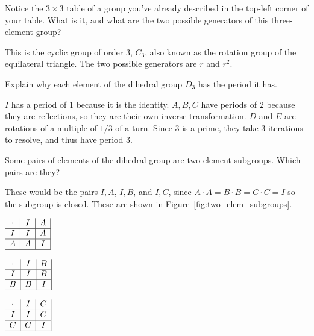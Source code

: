 \documentclass[../gatm_answers.tex]{subfiles}
\begin{document}
\begin{outer_problem}
\item Notice the $3\times 3$ table of a group you've already described in the top-left corner of your table. What is it, and what are the two possible generators of this three-element group?
\end{outer_problem}

This is the cyclic group of order $3$, $C_3$, also known as the rotation group of the equilateral triangle. The two possible generators are $r$ and $r^2$.

\begin{outer_problem}
\item Explain why each element of the dihedral group $D_3$ has the period it has.
\end{outer_problem}

$I$ has a period of $1$ because it is the identity. $A,B,C$ have periods of $2$ because they are reflections, so they are their own inverse transformation. $D$ and $E$ are rotations of a multiple of $1/3$ of a turn. Since $3$ is a prime, they take $3$ iterations to resolve, and thus have period $3$.

\begin{outer_problem}
\item Some pairs of elements of the dihedral group are two-element subgroups. Which pairs are they?
\end{outer_problem}

These would be the pairs ${I,A}$, ${I,B}$, and ${I,C}$, since $A\cdot A=B\cdot B=C\cdot C = I$ so the subgroup is closed. These are shown in Figure~\ref{fig:two_elem_subgroups}.

\begin{center}
\begin{minipage}{0.3\textwidth}
\centering
$\begin{array}{c|c|c|}
\cdot & I & A \\ \hline
I & I & A \\ \hline
A & A & I \\ \hline
\end{array}$
\end{minipage}\hfill
\begin{minipage}{0.3\textwidth}
\centering
$\begin{array}{c|c|c|}
\cdot & I & B \\ \hline
I & I & B \\ \hline
B & B & I \\ \hline
\end{array}$
\end{minipage}\hfill
\begin{minipage}{0.3\textwidth}
\centering
$\begin{array}{c|c|c|}
\cdot & I & C \\ \hline
I & I & C \\ \hline
C & C & I \\ \hline
\end{array}$
\end{minipage}
\label{fig:two_elem_subgroups}
\end{center}
\end{document}
